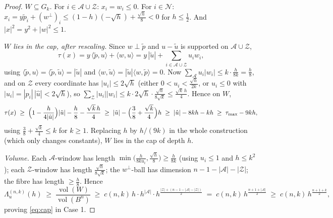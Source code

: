 ﻿\documentclass[11pt]{article}
\newcommand{\vol}{\operatorname{vol}}
\begin{document}
\begin{proof}
\emph{$W\subseteq G_k$.}  For $i\in\mathcal A\cup\mathcal Z$:
$x_i=w_i\le0$.  For $i\in\mathcal N$:
$x_i=y\tilde p_i+(w^\perp)_i\le(1-h)(-\sqrt h)+\frac{\sqrt h}8<0$ for
$h\le\frac12$.  And $|x|^2=y^2+|w|^2\le1$.

\emph{$W$ lies in the cap, after rescaling.}  Since $w\perp\tilde p$ and
$u-\tilde u$ is supported on $\mathcal A\cup\mathcal Z$,
\[
\tau(x)=y\,\langle\tilde p,u\rangle+\langle w,u\rangle
=y\,|\tilde u|+\sum_{i\in\mathcal A\cup\mathcal Z}u_iw_i ,
\]
using $\langle\tilde p,u\rangle=\langle\tilde p,\tilde u\rangle=|\tilde u|$
and $\langle w,\tilde u\rangle=|\tilde u|\langle w,\tilde p\rangle=0$.  Now
$\sum_{\mathcal A}u_i|w_i|\le k\cdot\frac h{8k}=\frac h8$, and on
$\mathcal Z$ every coordinate has $|u_i|\le2\sqrt h$ {\rm(}either
$0<u_i<\frac{\sqrt h}{2k}$, or $u_i\le0$ with
$|u_i|=|p_i|\,|\hat u|<2\sqrt h${\rm)}, so
$\sum_{\mathcal Z}|u_i||w_i|\le k\cdot2\sqrt h\cdot
\frac{\sqrt h}{8\sqrt k}\le\frac{\sqrt k\,h}{4}$.  Hence on $W$,
\[
\tau(x)\;\ge\;\Bigl(1-\frac h{4|\tilde u|}\Bigr)|\tilde u|
-\frac h8-\frac{\sqrt k\,h}{4}
\;\ge\;|\tilde u|-\Bigl(\frac38+\frac{\sqrt k}4\Bigr)h
\;\ge\;|\hat u|-8kh-kh
\;\ge\;\tau_{\max}-9kh ,
\]
using $\frac38+\frac{\sqrt k}4\le k$ for $k\ge1$.
Replacing $h$ by $h/(9k)$ in the whole construction (which only changes
constants), $W$ lies in the cap of depth $h$.

\emph{Volume.}  Each $\mathcal A$-window has length
$\min\bigl(\frac h{8ku_i},\frac{\sqrt h}8\bigr)\ge\frac h{8k}$ (using
$u_i\le1$ and $h\le k^2$); each $\mathcal Z$-window has length
$\frac{\sqrt h}{8\sqrt k}$; the $w^\perp$-ball has dimension
$n-1-|\mathcal A|-|\mathcal Z|$; the fibre has length $\ge\frac h8$.  Hence
\[
\Lambda^{(n,k)}_u(h)\;\ge\;\frac{\vol(W)}{\vol(B^n)}
\;\ge\;c(n,k)\,h\cdot h^{|\mathcal A|}\cdot
h^{\frac{|\mathcal Z|+(n-1-|\mathcal A|-|\mathcal Z|)}2}
\;=\;c(n,k)\,h^{\frac{n+1+|\mathcal A|}2}
\;\ge\;c(n,k)\,h^{\frac{n+1+k}2},
\]
proving \eqref{eq:cap} in Case 1.


\end{proof}
\end{document}

